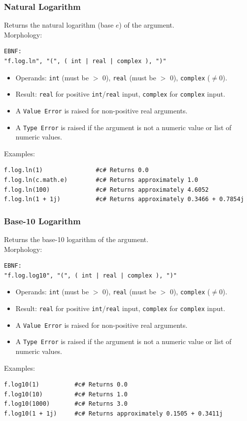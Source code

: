 \subsubsection{Natural Logarithm}
Returns the natural logarithm (base $e$) of the argument. \\
Morphology:
\begin{verbatim}
EBNF:
"f.log.ln", "(", ( int | real | complex ), ")"
\end{verbatim}
\begin{itemize}
\item Operands: \texttt{int} (must be $>$ 0), \texttt{real} (must be $>$ 0), \texttt{complex} ($\neq 0$).
\item Result: \texttt{real} for positive \texttt{int}/\texttt{real} input, \texttt{complex} for \texttt{complex} input.
\item A \texttt{Value Error} is raised for non-positive real arguments.
\item A \texttt{Type Error} is raised if the argument is not a numeric value or list of numeric values.
\end{itemize}
Examples:
\begin{verbatim}
f.log.ln(1)               #c# Returns 0.0
f.log.ln(c.math.e)        #c# Returns approximately 1.0
f.log.ln(100)             #c# Returns approximately 4.6052
f.log.ln(1 + 1j)          #c# Returns approximately 0.3466 + 0.7854j
\end{verbatim}

\subsubsection{Base-10 Logarithm}
Returns the base-10 logarithm of the argument. \\
Morphology:
\begin{verbatim}
EBNF:
"f.log.log10", "(", ( int | real | complex ), ")"
\end{verbatim}
\begin{itemize}
\item Operands: \texttt{int} (must be $>$ 0), \texttt{real} (must be $>$ 0), \texttt{complex} ($\neq 0$).
\item Result: \texttt{real} for positive \texttt{int}/\texttt{real} input, \texttt{complex} for \texttt{complex} input.
\item A \texttt{Value Error} is raised for non-positive real arguments.
\item A \texttt{Type Error} is raised if the argument is not a numeric value or list of numeric values.
\end{itemize}
Examples:
\begin{verbatim}
f.log10(1)          #c# Returns 0.0
f.log10(10)         #c# Returns 1.0
f.log10(1000)       #c# Returns 3.0
f.log10(1 + 1j)     #c# Returns approximately 0.1505 + 0.3411j
\end{verbatim}

